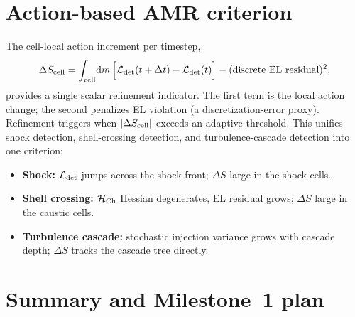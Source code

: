 \documentclass[11pt]{article}
\newcommand{\dd}{\mathrm{d}}
\begin{document}
\section{Action-based AMR criterion}
The cell-local action increment per timestep,
\begin{equation}
  \Delta S_{\rm cell} = \int_{\rm cell}\!\dd m\,\Bigl[\mathcal{L}_{\rm det}(t+\Delta t) - \mathcal{L}_{\rm det}(t)\Bigr] - (\text{discrete EL residual})^2,
\end{equation}
provides a single scalar refinement indicator. The first term is the
local action change; the second penalizes EL violation (a
discretization-error proxy). Refinement triggers when $|\Delta S_{\rm cell}|$
exceeds an adaptive threshold. This unifies shock detection, shell-crossing
detection, and turbulence-cascade detection into one criterion:
\begin{itemize}
\item \textbf{Shock:} $\mathcal{L}_{\rm det}$ jumps across the shock front;
$\Delta S$ large in the shock cells.
\item \textbf{Shell crossing:} $\mathcal{H}_{\rm Ch}$ Hessian degenerates,
EL residual grows; $\Delta S$ large in the caustic cells.
\item \textbf{Turbulence cascade:} stochastic injection variance grows
with cascade depth; $\Delta S$ tracks the cascade tree directly.
\end{itemize}

\section{Summary and Milestone~1 plan}
\end{document}
